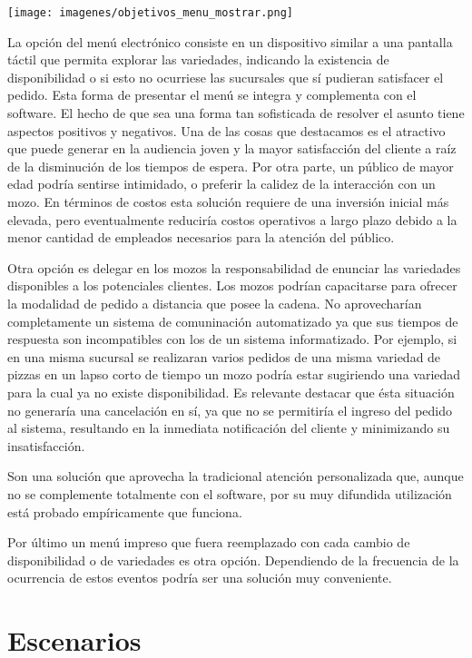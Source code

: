 \documentclass[a4paper,10pt]{article}
\begin{document}
\texttt{[image: imagenes/objetivos\_menu\_mostrar.png]}

La opción del menú electrónico consiste en un dispositivo similar a una pantalla táctil que permita explorar las variedades, indicando la existencia de disponibilidad o si esto no ocurriese las sucursales que sí pudieran satisfacer el pedido. Esta forma de presentar el menú se integra y complementa con el software. El hecho de que sea una forma tan sofisticada de resolver el asunto tiene aspectos positivos y negativos. Una de las cosas que destacamos es el atractivo que puede generar en la audiencia joven y la mayor satisfacción del cliente a raíz de la disminución de los tiempos de espera. 
Por otra parte, un público de mayor edad podría sentirse intimidado, o preferir la calidez de la interacción con un mozo. En términos de costos esta solución requiere de una inversión inicial más elevada, pero eventualmente reduciría costos operativos a largo plazo debido a la menor cantidad de empleados necesarios para la atención del público. 

Otra opción es delegar en los mozos la responsabilidad de enunciar las variedades disponibles a los potenciales clientes.
Los mozos podrían capacitarse para ofrecer la modalidad de pedido a distancia que posee la cadena. No aprovecharían completamente un sistema de comuninación automatizado ya que sus tiempos de respuesta son incompatibles con los de un sistema informatizado. Por ejemplo, si en una misma sucursal se realizaran varios pedidos de una misma variedad de pizzas en un lapso corto de tiempo un mozo podría estar sugiriendo una variedad para la cual ya no existe disponibilidad. Es relevante destacar que ésta situación no generaría una cancelación en sí, ya que no se permitiría el ingreso del pedido al sistema, resultando en la inmediata notificación del cliente y minimizando su insatisfacción.

Son una solución que aprovecha la tradicional atención personalizada que, aunque no se complemente totalmente con el software, por su muy difundida utilización está probado empíricamente que funciona.

Por último un menú impreso que fuera reemplazado con cada cambio de disponibilidad o de variedades es otra opción. Dependiendo de la frecuencia de la ocurrencia de estos eventos podría ser una solución muy conveniente. 

\newpage
\section*{Escenarios}
\end{document}
